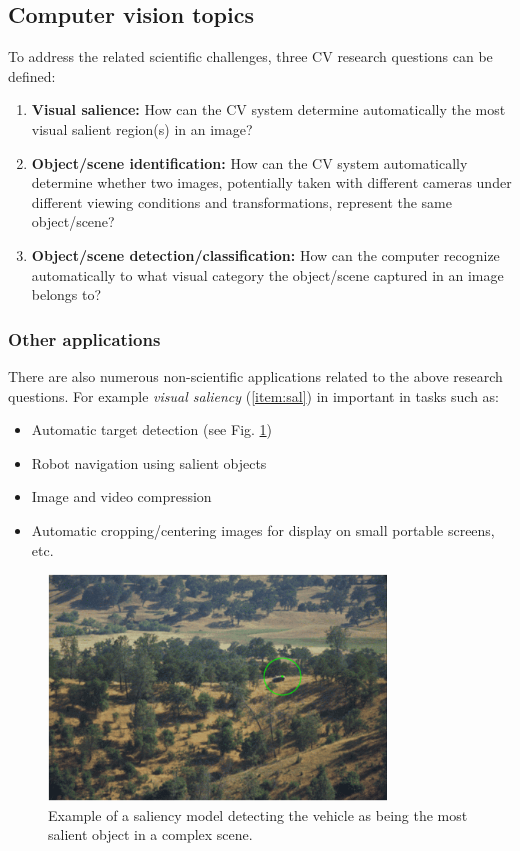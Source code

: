 \subsection{Computer vision topics} 
To address the related scientific challenges, three  CV research questions can be defined:
\begin{enumerate}
\item {\bf Visual salience:} How can the CV system determine automatically the most visual salient region(s) in an image?\label{item:sal}
\item {\bf Object/scene identification:} How can the CV system automatically determine whether two images, potentially taken with different cameras under different viewing conditions and transformations, represent the same object/scene?\label{item:ident}
\item {\bf Object/scene detection/classification:} How can the computer recognize automatically to what visual category the object/scene captured in an image belongs to? \label{item:und}
\end{enumerate}

\subsubsection{Other applications}
There are also numerous non-scientific applications related to the above research questions.  For example {\em visual saliency} (\ref{item:sal}) in important in tasks such as:
\begin{itemize}
\item Automatic target detection (see Fig. \ref{fig:sal})
\item Robot navigation using salient objects
\item Image and video compression
\item Automatic cropping/centering images for display on small portable screens, etc.
\end{itemize}

\begin{figure}[H]
\begin{center}
\includegraphics[width=0.8\textwidth]{fig/saliency}
\end{center}
\caption{Example of a saliency model detecting the vehicle as being the most salient object in a complex scene.}
\label{fig:sal}
\end{figure}


